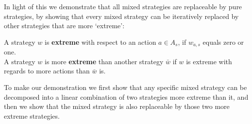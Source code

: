 In light of this we demonstrate that all mixed strategies are replaceable by pure strategies, by showing that every mixed strategy can be iteratively replaced by other strategies that are more `extreme':

\begin{Definition}\label{def2}
A strategy $w$ is \textbf{extreme} with respect to an action $a\in A_{s}$, if $w_{a,s}$ equals zero or one.\\A strategy $w$ is more \textbf{extreme} than another strategy $\bar{w}$ if $w$ is extreme with regards to more actions than $\bar{w}$ is.
\end{Definition}

To make our demonstration we first show that any specific mixed strategy can be decomposed into a linear combination of two strategies more extreme than it, and then we show that the mixed strategy is also replaceable by those two more extreme strategies.

